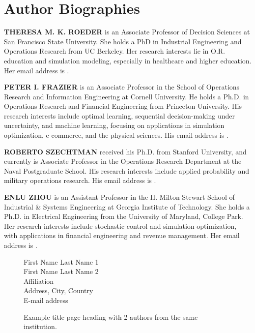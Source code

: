 \documentclass{scspaperproc}
\theoremstyle{scsthe}
\begin{document}





\section*{Author Biographies}

\textbf{\uppercase{THERESA M. K. ROEDER}} is an Associate Professor of Decision Sciences at San Francisco State University. She holds a PhD in Industrial Engineering and Operations Research from UC Berkeley. Her research interests lie in O.R. education and simulation modeling, especially in healthcare and higher education. Her email address is .

\textbf{\uppercase{PETER I. FRAZIER}} is an Associate Professor in the School of Operations Research and Information Engineering at Cornell University. He holds a Ph.D. in Operations Research and Financial Engineering from Princeton University. His research interests include optimal learning, sequential decision-making under uncertainty, and machine learning, focusing on applications in simulation optimization, e-commerce, and the physical sciences.  His email address is .

\textbf{\uppercase{ROBERTO SZECHTMAN}} received his Ph.D. from Stanford University, and currently is Associate Professor in the Operations Research Department at the Naval Postgraduate School. His research interests include applied probability and military operations research. His email address is .

\textbf{\uppercase{ENLU ZHOU}} is an Assistant Professor in the H. Milton Stewart School of Industrial \& Systems Engineering at Georgia Institute of Technology. She holds a Ph.D. in Electrical Engineering from the University of Maryland, College Park. Her research interests include stochastic control and simulation optimization, with applications in financial engineering and revenue management. Her email address is .

\newpage

\begin{figure*}[htb]
{
\centering
First Name Last Name 1 \\
First Name Last Name 2 \\
\vspace{12pt}
Affiliation \\
Address, City, Country \\
E-mail address
\caption{Example title page heading with 2 authors from the same institution.\label{fig2same}}
}
\end{figure*}
\end{document}
